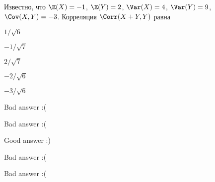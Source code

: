 
\begin{question}
Известно, что \(\E(X)=-1\), \(\E(Y)=2\), \(\Var(X)=4\), \(\Var(Y)=9\),
\(\Cov(X,Y)=-3\). Корреляция \(\Corr(X+Y, Y)\) равна
\begin{answerlist}
  \item \(1/\sqrt{6}\)
  \item \(-1/\sqrt{7}\)
  \item \(2/\sqrt{7}\)
  \item \(-2/\sqrt{6}\)
  \item \(-3/\sqrt{6}\)
\end{answerlist}
\end{question}

\begin{solution}
\begin{answerlist}
  \item Bad answer :(
  \item Bad answer :(
  \item Good answer :)
  \item Bad answer :(
  \item Bad answer :(
\end{answerlist}
\end{solution}

